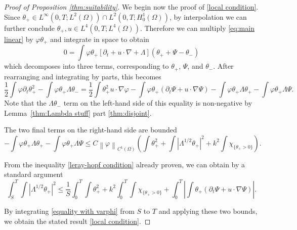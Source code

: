 \documentclass[11pt]{amsart}
\theoremstyle{remark}
\theoremstyle{definition}
\newcommand{\norm}[1]{\left\lVert#1\right\rVert}
\newcommand{\paren}[1]{\left( #1 \right)}
\newcommand{\bracket}[1]{\left[ #1 \right]}
\newcommand{\abs}[1]{\left\lvert #1 \right\rvert}
\newcommand{\del}{\partial}
\newcommand{\grad}{\nabla}
\newcommand{\n}{^{-1}}
\newcommand{\indic}[1]{\chi_{\{#1\}}}
\begin{document}
\begin{proof}[Proof of Proposition \ref{thm:suitability}]
We begin now the proof of \eqref{local condition}.  Since $\theta_+ \in L^\infty(0,T; L^2(\Omega)) \cap L^2(0,T; H_0^1(\Omega))$, by interpolation we can further conclude $\theta_+,u \in L^4(0,T; L^4(\Omega))$.  Therefore we can multiply \eqref{eq:main linear} by $\varphi \theta_+$ and integrate in space to obtain
\[ 0 = \int \varphi \theta_+ \bracket{ \del_t + u \cdot \grad + \Lambda } \paren{\theta_+ + \Psi - \theta_-} \]
which decomposes into three terms, corresponding to $\theta_+$, $\Psi$, and $\theta_-$.  After rearranging and integrating by parts, this becomes
\begin{equation}\label{equality with varphi}
\frac{1}{2} \int \varphi \del_t \theta_+^2 - \int \varphi \theta_+ \Lambda \theta_- = \frac{1}{2} \int  \theta_+^2 u \cdot \grad \varphi - \int \varphi \theta_+ \paren{\del_t \Psi + u \cdot \grad \Psi} - \int \varphi \theta_+ \Lambda \theta_+ - \int \varphi \theta_+ \Lambda \Psi. 
\end{equation}
Note that the $\Lambda \theta_-$ term on the left-hand side of this equality is non-negative by Lemma~\ref{thm:Lambda stuff} part \eqref{thm:disjoint}.  

The two final terms on the right-hand side are bounded
\[ - \int \varphi \theta_+ \Lambda \theta_+ - \int \varphi \theta_+ \Lambda \Psi \leq C \norm{\varphi}_{C^1(\Omega)} \paren{\int \theta_+^2 + \int \abs{\Lambda^{1/2}\theta_+}^2 + k^2 \int \indic{\theta_+>0} }. \]

From the inequality \eqref{leray-hopf condition} already proven, we can obtain by a standard argument
\[ \int_S^T\!\! \int \abs{\Lambda^{1/2} \theta_+}^2 \leq \frac{1}{S} \int_0^T\!\! \int \theta_+^2 + k^2 \int_0^T\!\! \int \indic{\theta_+>0} + \int_0^T\!\! \abs{\int \theta_+ \paren{\del_t \Psi + u\cdot\grad\Psi}}. \]

By integrating \eqref{equality with varphi} from $S$ to $T$ and applying these two bounds, we obtain the stated result \eqref{local condition}.  



\end{proof}
\end{document}
